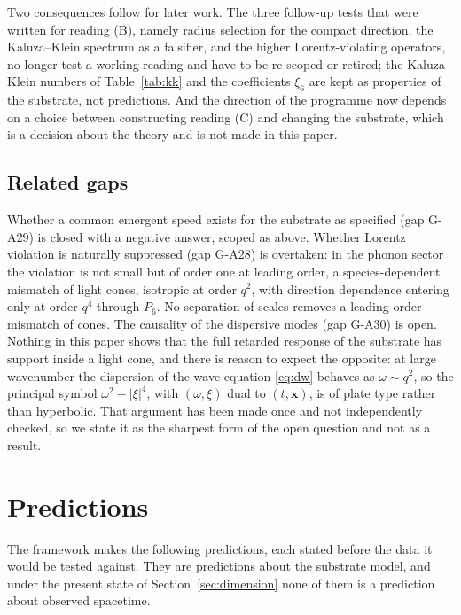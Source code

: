 \documentclass[a4paper,11pt]{article}
\numberwithin{equation}{section}
\theoremstyle{jsplain}
\theoremstyle{jsrem}
\begin{document}
Two consequences follow for later work. The three follow-up tests that were written for reading (B), namely radius selection for the compact direction, the Kaluza--Klein spectrum as a falsifier, and the higher Lorentz-violating operators, no longer test a working reading and have to be re-scoped or retired; the Kaluza--Klein numbers of Table~\ref{tab:kk} and the coefficients $\xi_6$ are kept as properties of the substrate, not predictions. And the direction of the programme now depends on a choice between constructing reading (C) and changing the substrate, which is a decision about the theory and is not made in this paper.

\subsection{Related gaps}

Whether a common emergent speed exists for the substrate as specified (gap G-A29) is closed with a negative answer, scoped as above. Whether Lorentz violation is naturally suppressed (gap G-A28) is overtaken: in the phonon sector the violation is not small but of order one at leading order, a species-dependent mismatch of light cones, isotropic at order $q^2$, with direction dependence entering only at order $q^4$ through $P_6$. No separation of scales removes a leading-order mismatch of cones. The causality of the dispersive modes (gap G-A30) is open. Nothing in this paper shows that the full retarded response of the substrate has support inside a light cone, and there is reason to expect the opposite: at large wavenumber the dispersion of the wave equation \eqref{eq:dw} behaves as $\omega\sim q^2$, so the principal symbol $\omega^2-|\xi|^4$, with $(\omega,\xi)$ dual to $(t,\mathbf{x})$, is of plate type rather than hyperbolic. That argument has been made once and not independently checked, so we state it as the sharpest form of the open question and not as a result.

\section{Predictions}\label{sec:predictions}

The framework makes the following predictions, each stated before the data it would be tested against. They are predictions about the substrate model, and under the present state of Section~\ref{sec:dimension} none of them is a prediction about observed spacetime.
\end{document}
